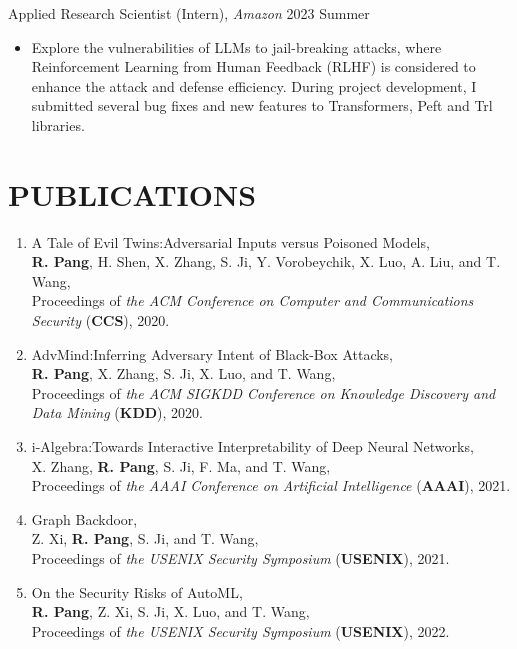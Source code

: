 \documentclass[letterpaper,11pt]{article}
\begin{document}
\noindent
Applied Research Scientist (Intern), \textit{Amazon}  \hfill 2023 Summer
\begin{itemize}
\item[]
\vspace{-5pt}Explore the vulnerabilities of LLMs to jail-breaking attacks, where Reinforcement Learning from Human Feedback (RLHF) is considered to enhance the attack and defense efficiency. During project development, I submitted several bug fixes and new features to Transformers, Peft and Trl libraries.
\end{itemize}


\section{PUBLICATIONS}

\begin{enumerate}[labelsep=15pt, parsep=-4pt]

    \item A Tale of Evil Twins:\@ Adversarial Inputs versus Poisoned Models,\\
    \textbf{R. Pang}, H. Shen, X. Zhang, S. Ji, Y. Vorobeychik, X. Luo, A. Liu, and T. Wang,\\
    Proceedings of {\it the ACM Conference on Computer and Communications Security\/} (\textbf{CCS}), 2020.
    
    \item AdvMind:\@ Inferring Adversary Intent of Black-Box Attacks,\\
    \textbf{R. Pang}, X. Zhang, S. Ji, X. Luo, and T. Wang,\\
    Proceedings of {\it the ACM SIGKDD Conference on Knowledge Discovery and Data Mining\/} (\textbf{KDD}), 2020.
    
    \item i-Algebra:\@ Towards Interactive Interpretability of Deep Neural Networks,\\
    X. Zhang, \textbf{R. Pang}, S. Ji, F. Ma, and T. Wang,\\
    Proceedings of {\it the AAAI Conference on Artificial Intelligence\/} (\textbf{AAAI}), 2021.
    
    \item Graph Backdoor,\\
    Z. Xi, \textbf{R. Pang}, S. Ji, and T. Wang,\\
    Proceedings of {\it the USENIX Security Symposium\/} (\textbf{USENIX}), 2021.
    
    \item On the Security Risks of AutoML,\\
    \textbf{R. Pang}, Z. Xi, S. Ji, X. Luo, and T. Wang,\\
    Proceedings of {\it the USENIX Security Symposium\/} (\textbf{USENIX}), 2022.
    

\end{enumerate}
\end{document}
